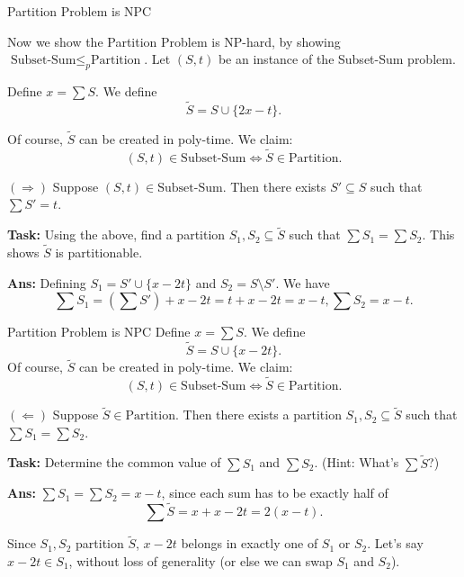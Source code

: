 \documentclass{beamer}
\begin{document}
\begin{frame}{Partition Problem is NPC}

Now we show the Partition Problem is NP-hard, by showing $\text{Subset-Sum} \leq_p \text{Partition}$. Let $(S, t)$ be an instance of the Subset-Sum problem.


\pause

Define $x = \sum S$. We define
$$\tilde{S} = S \cup \{2x - t\}.$$

\pause 

Of course, $\tilde{S}$ can be created in poly-time. We claim:
$$(S, t) \in \text{Subset-Sum} \Leftrightarrow \tilde{S} \in \text{Partition}.$$

\pause \vspace{2mm}

$(\Rightarrow)$ Suppose $(S, t) \in \text{Subset-Sum}$. Then there exists $S' \subseteq S$ such that $\sum S' = t$. 

\textbf{Task:} Using the above, find a partition $S_1, S_2 \subseteq \tilde{S}$ such that $\sum S_1 = \sum S_2$. This shows $\tilde{S}$ is partitionable. \pause

\textbf{Ans:} Defining $S_1 = S' \cup \{x - 2t\}$ and $S_2 = S \setminus S'$. We have
$$\sum S_1 = (\sum S') + x - 2t = t + x - 2t = x - t, \sum S_2 = x - t.$$

\end{frame}

\begin{frame}{Partition Problem is NPC}
Define $x = \sum S$. We define
$$\tilde{S} = S \cup \{x - 2t\}.$$
Of course, $\tilde{S}$ can be created in poly-time. We claim:
$$(S, t) \in \text{Subset-Sum} \Leftrightarrow \tilde{S} \in \text{Partition}.$$

\pause \vspace{2mm}

$(\Leftarrow)$ Suppose $\tilde{S} \in \text{Partition}$. Then there exists a partition $S_1, S_2 \subseteq \tilde{S}$ such that $\sum S_1 = \sum S_2$.

\vspace{2mm} \pause

\textbf{Task:} Determine the common value of $\sum S_1$ and $\sum S_2$. (Hint: What's $\sum \tilde{S}$?)

\pause

\textbf{Ans:} $\sum S_1 = \sum S_2 = x - t$, since each sum has to be exactly half of $$\sum \tilde{S} = x + x - 2t = 2(x - t).$$

\pause \vspace{2mm}

Since $S_1, S_2$ partition $\tilde{S}$, $x - 2t$ belongs in exactly one of $S_1$ or $S_2$. Let's say $x - 2t \in S_1$, without loss of generality (or else we can swap $S_1$ and $S_2$).

\pause 

\end{frame}
\end{document}
